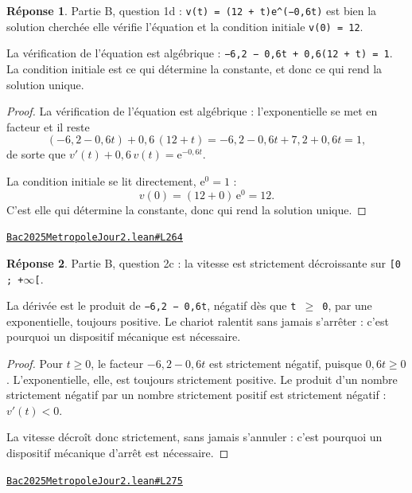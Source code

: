 \documentclass[11pt,a4paper]{article}
\theoremstyle{definition}
\theoremstyle{plain}
\theoremstyle{definition}
\newtheorem*{reponse}{Réponse}
\newcommand{\source}[2]{\par\smallskip\noindent\hfill{\footnotesize\href{#1}{\texttt{#2}}}\par\smallskip}
\begin{document}
\begin{reponse}
Partie B, question 1d : \texttt{v(t) = (12 + t)e\textasciicircum{}(−0,6t)} est bien la solution cherchée \textemdash{}
elle vérifie l'équation et la condition initiale \texttt{v(0) = 12}.

La vérification de l'équation est algébrique : \texttt{−6,2 − 0,6t + 0,6(12 + t) = 1}. La
condition initiale est ce qui détermine la constante, et donc ce qui rend la solution
unique.
\end{reponse}
\begin{proof}
La vérification de l'équation est algébrique : l'exponentielle se met en facteur et il
reste
\[ (-6{,}2 - 0{,}6t) + 0{,}6\,(12 + t) = -6{,}2 - 0{,}6t + 7{,}2 + 0{,}6t = 1 , \]
de sorte que $v'(t) + 0{,}6\,v(t) = \mathrm{e}^{-0{,}6t}$.

La condition initiale se lit directement, $\mathrm{e}^0 = 1$ :
\[ v(0) = (12 + 0)\,\mathrm{e}^{0} = 12 . \]
C'est elle qui détermine la constante, donc qui rend la solution unique.
\end{proof}
\source{https://github.com/Commutator-IO/learn-lean/blob/main/exams/2025/Bac2025MetropoleJour2.lean\#L264}{Bac2025MetropoleJour2.lean\#L264}

\begin{reponse}
Partie B, question 2c : la vitesse est strictement décroissante sur \texttt{[0 ; +\(\infty\)[}.

La dérivée est le produit de \texttt{−6,2 − 0,6t}, négatif dès que \texttt{t \(\ge\) 0}, par une
exponentielle, toujours positive. Le chariot ralentit sans jamais s'arrêter : c'est
pourquoi un dispositif mécanique est nécessaire.
\end{reponse}
\begin{proof}
Pour $t \ge 0$, le facteur $-6{,}2 - 0{,}6t$ est strictement négatif, puisque
$0{,}6t \ge 0$. L'exponentielle, elle, est toujours strictement positive. Le produit d'un
nombre strictement négatif par un nombre strictement positif est strictement négatif :
$v'(t) < 0$.

La vitesse décroît donc strictement, sans jamais s'annuler : c'est pourquoi un dispositif
mécanique d'arrêt est nécessaire.
\end{proof}
\source{https://github.com/Commutator-IO/learn-lean/blob/main/exams/2025/Bac2025MetropoleJour2.lean\#L275}{Bac2025MetropoleJour2.lean\#L275}
\end{document}
